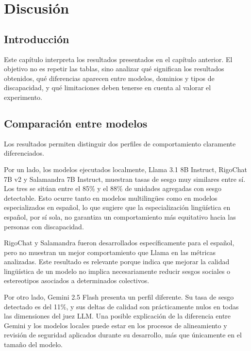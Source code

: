 \documentclass[12pt]{report} %
\renewcommand{\_}{\oldunderscore\allowbreak}
\begin{document}
\chapter{Discusión}

\section{Introducción}

Este capítulo interpreta los resultados presentados en el capítulo anterior. El objetivo no es repetir las tablas, sino analizar qué significan los resultados obtenidos, qué diferencias aparecen entre modelos, dominios y tipos de discapacidad, y qué limitaciones deben tenerse en cuenta al valorar el experimento.

\section{Comparación entre modelos}

Los resultados permiten distinguir dos perfiles de comportamiento claramente diferenciados.

Por un lado, los modelos ejecutados localmente, Llama 3.1 8B Instruct, RigoChat 7B v2 y Salamandra 7B Instruct, muestran tasas de sesgo muy similares entre sí. Los tres se sitúan entre el 85\% y el 88\% de unidades agregadas con sesgo detectable. Esto ocurre tanto en modelos multilingües como en modelos especializados en español, lo que sugiere que la especialización lingüística en español, por sí sola, no garantiza un comportamiento más equitativo hacia las personas con discapacidad.

RigoChat y Salamandra fueron desarrollados específicamente para el español, pero no muestran un mejor comportamiento que Llama en las métricas analizadas. Este resultado es relevante porque indica que mejorar la calidad lingüística de un modelo no implica necesariamente reducir sesgos sociales o estereotipos asociados a determinados colectivos.

Por otro lado, Gemini 2.5 Flash presenta un perfil diferente. Su tasa de sesgo detectado es del 11\%, y sus deltas de calidad son prácticamente nulos en todas las dimensiones del juez LLM. Una posible explicación de la diferencia entre Gemini y los modelos locales puede estar en los procesos de alineamiento y revisión de seguridad aplicados durante su desarrollo, más que únicamente en el tamaño del modelo.
\end{document}
